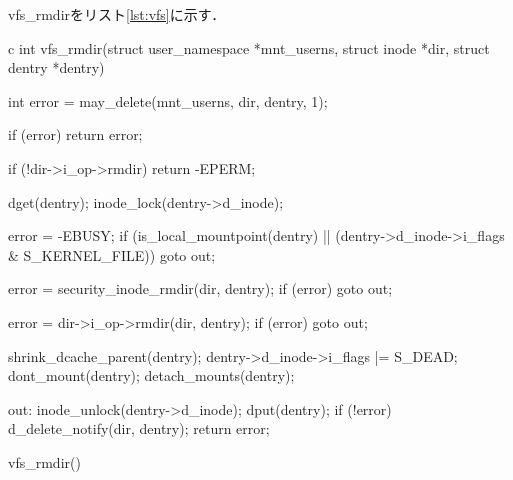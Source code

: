 vfs_rmdirをリスト\ref{lst:vfs}に示す．
\begin{longlisting}
\begin{myminted}{c}{}
int vfs_rmdir(struct user_namespace *mnt_userns, struct inode *dir,
         struct dentry *dentry)
{
	int error = may_delete(mnt_userns, dir, dentry, 1);

	if (error)
		return error;

	if (!dir->i_op->rmdir)
		return -EPERM;

	dget(dentry);
	inode_lock(dentry->d_inode);

	error = -EBUSY;
	if (is_local_mountpoint(dentry) ||
	    (dentry->d_inode->i_flags & S_KERNEL_FILE))
		goto out;

	error = security_inode_rmdir(dir, dentry);
	if (error)
		goto out;

	error = dir->i_op->rmdir(dir, dentry);
	if (error)
		goto out;

	shrink_dcache_parent(dentry);
	dentry->d_inode->i_flags |= S_DEAD;
	dont_mount(dentry);
	detach_mounts(dentry);

out:
	inode_unlock(dentry->d_inode);
	dput(dentry);
	if (!error)
		d_delete_notify(dir, dentry);
	return error;
}
\end{myminted}
\caption{vfs_rmdir()}
\label{lst:vfs}
\end{longlisting}

